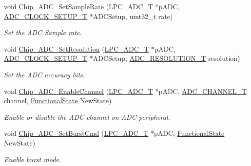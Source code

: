 \begin{DoxyCompactItemize}
void \hyperlink{group___a_d_c__18_x_x__43_x_x_gae1629ea72c61a224e69e55f7699b7810}{Chip\+\_\+\+A\+D\+C\+\_\+\+Set\+Sample\+Rate} (\hyperlink{struct_l_p_c___a_d_c___t}{L\+P\+C\+\_\+\+A\+D\+C\+\_\+T} $\ast$p\+A\+DC, \hyperlink{struct_a_d_c___c_l_o_c_k___s_e_t_u_p___t}{A\+D\+C\+\_\+\+C\+L\+O\+C\+K\+\_\+\+S\+E\+T\+U\+P\+\_\+T} $\ast$A\+D\+C\+Setup, uint32\+\_\+t rate)
\begin{DoxyCompactList}\small\item\em Set the A\+DC Sample rate. \end{DoxyCompactList}\item 
void \hyperlink{group___a_d_c__18_x_x__43_x_x_ga8d536c4e7b6be7e6f1a77b69e5fbf1eb}{Chip\+\_\+\+A\+D\+C\+\_\+\+Set\+Resolution} (\hyperlink{struct_l_p_c___a_d_c___t}{L\+P\+C\+\_\+\+A\+D\+C\+\_\+T} $\ast$p\+A\+DC, \hyperlink{struct_a_d_c___c_l_o_c_k___s_e_t_u_p___t}{A\+D\+C\+\_\+\+C\+L\+O\+C\+K\+\_\+\+S\+E\+T\+U\+P\+\_\+T} $\ast$A\+D\+C\+Setup, \hyperlink{group___a_d_c__18_x_x__43_x_x_ga515c7ef9570ef08b29f55cd880e2e452}{A\+D\+C\+\_\+\+R\+E\+S\+O\+L\+U\+T\+I\+O\+N\+\_\+T} resolution)
\begin{DoxyCompactList}\small\item\em Set the A\+DC accuracy bits. \end{DoxyCompactList}\item 
void \hyperlink{group___a_d_c__18_x_x__43_x_x_gaf2fd510be97c2747ed3c53c132a45e15}{Chip\+\_\+\+A\+D\+C\+\_\+\+Enable\+Channel} (\hyperlink{struct_l_p_c___a_d_c___t}{L\+P\+C\+\_\+\+A\+D\+C\+\_\+T} $\ast$p\+A\+DC, \hyperlink{group___a_d_c__18_x_x__43_x_x_ga30ee7058bc7cc1daff718b29b42bed4e}{A\+D\+C\+\_\+\+C\+H\+A\+N\+N\+E\+L\+\_\+T} channel, \hyperlink{group___l_p_c___types___public___types_gac9a7e9a35d2513ec15c3b537aaa4fba1}{Functional\+State} New\+State)
\begin{DoxyCompactList}\small\item\em Enable or disable the A\+DC channel on A\+DC peripheral. \end{DoxyCompactList}\item 
void \hyperlink{group___a_d_c__18_x_x__43_x_x_gaa9890ccee17bea824b2af26e5bb2f1d6}{Chip\+\_\+\+A\+D\+C\+\_\+\+Set\+Burst\+Cmd} (\hyperlink{struct_l_p_c___a_d_c___t}{L\+P\+C\+\_\+\+A\+D\+C\+\_\+T} $\ast$p\+A\+DC, \hyperlink{group___l_p_c___types___public___types_gac9a7e9a35d2513ec15c3b537aaa4fba1}{Functional\+State} New\+State)
\begin{DoxyCompactList}\small\item\em Enable burst mode. \end{DoxyCompactList}\end{DoxyCompactItemize}


